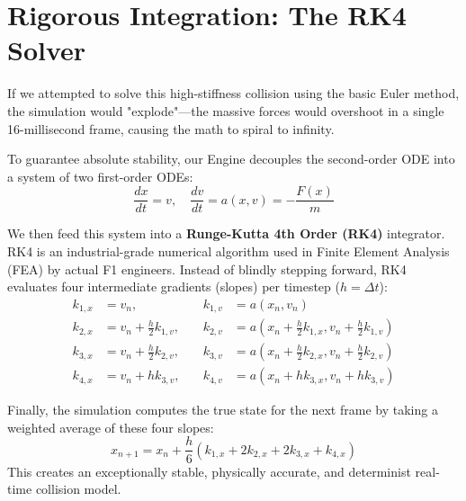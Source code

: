 \documentclass[12pt]{article}
\begin{document}
\section{Rigorous Integration: The RK4 Solver}
If we attempted to solve this high-stiffness collision using the basic Euler method, the simulation would "explode"—the massive forces would overshoot in a single 16-millisecond frame, causing the math to spiral to infinity.

To guarantee absolute stability, our Engine decouples the second-order ODE into a system of two first-order ODEs:
\begin{equation}
    \frac{dx}{dt} = v, \quad \frac{dv}{dt} = a(x, v) = -\frac{F(x)}{m}
\end{equation}

We then feed this system into a \textbf{Runge-Kutta 4th Order (RK4)} integrator. RK4 is an industrial-grade numerical algorithm used in Finite Element Analysis (FEA) by actual F1 engineers. Instead of blindly stepping forward, RK4 evaluates four intermediate gradients (slopes) per timestep ($h = \Delta t$):
\begin{align*}
    k_{1,x} &= v_n, \quad &k_{1,v} &= a(x_n, v_n) \\
    k_{2,x} &= v_n + \frac{h}{2} k_{1,v}, \quad &k_{2,v} &= a\left(x_n + \frac{h}{2} k_{1,x}, v_n + \frac{h}{2} k_{1,v}\right) \\
    k_{3,x} &= v_n + \frac{h}{2} k_{2,v}, \quad &k_{3,v} &= a\left(x_n + \frac{h}{2} k_{2,x}, v_n + \frac{h}{2} k_{2,v}\right) \\
    k_{4,x} &= v_n + h k_{3,v}, \quad &k_{4,v} &= a(x_n + h k_{3,x}, v_n + h k_{3,v})
\end{align*}

Finally, the simulation computes the true state for the next frame by taking a weighted average of these four slopes:
\begin{equation}
    x_{n+1} = x_n + \frac{h}{6}(k_{1,x} + 2k_{2,x} + 2k_{3,x} + k_{4,x})
\end{equation}
This creates an exceptionally stable, physically accurate, and determinist real-time collision model.
\end{document}
